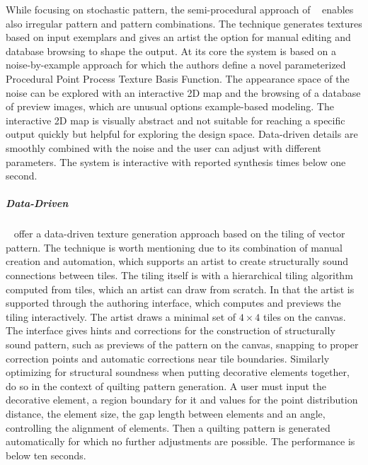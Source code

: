 While focusing on stochastic pattern, the semi-procedural approach of \citeauthor*{guehl_2020_stu}~\cite{guehl_2020_stu} enables also irregular pattern and pattern combinations. The technique
generates textures based on input exemplars and gives an artist the option for manual editing and database browsing to shape the output. At its core the system is based on a noise-by-example approach for which the authors define a novel parameterized Procedural Point Process Texture Basis Function. The appearance space of the noise can be explored with an interactive 2D map and the browsing of a database of preview images, which are unusual options example-based modeling. The interactive 2D map is visually abstract and not suitable for reaching a specific output quickly but helpful for exploring the design space. Data-driven details are smoothly combined with the noise and the user can adjust with different parameters. The system is interactive with reported synthesis times below one second.


\subparagraph*{Data-Driven}
\label{subpara:analysis_regular_tilings}

\citeauthor*{bian_2018_tpd}~\cite{bian_2018_tpd} offer a data-driven texture generation approach based on the tiling of vector pattern. The technique is worth mentioning due to its combination of manual creation and automation, which supports an artist to create structurally sound connections between tiles. The tiling itself is with a hierarchical tiling algorithm computed from tiles, which an artist can draw from scratch. In that the artist is supported through the authoring interface, which computes and previews the tiling interactively. The artist draws a minimal set of $4\times4$ tiles on the canvas. The interface gives hints and corrections for the construction of structurally sound pattern, such as previews of the pattern on the canvas, snapping to proper correction points and automatic corrections near tile boundaries. Similarly optimizing for structural soundness when putting decorative elements together,~\citeauthor*{li_2019_aqp}~\cite{li_2019_aqp} do so in the context of quilting pattern generation. A user must input the decorative element, a region boundary for it and values for the point distribution distance, the element size, the gap length between elements and an angle, controlling the alignment of elements. Then a quilting pattern is generated automatically for which no further adjustments are possible. The performance is below ten seconds.

